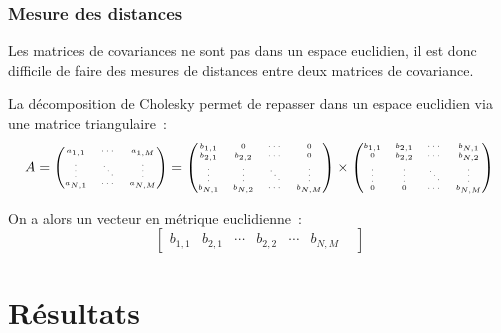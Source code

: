 \documentclass{beamer}
\begin{document}
\begin{frame}
    \frametitle{Mesure des distances}
    Les matrices de covariances ne sont pas dans un espace euclidien, il est donc difficile de faire des mesures de distances entre deux matrices de covariance.
    \vfill

    La décomposition de Cholesky permet de repasser dans un espace euclidien via une matrice triangulaire :
    \[
        \tiny \centering
        A =
        \begin{pmatrix}
            a_{1,1} & \cdots & a_{1,M} \\
            \vdots  & \ddots & \vdots  \\
            a_{N,1} & \cdots & a_{N,M} \\
        \end{pmatrix}
        =
        \begin{pmatrix}
            b_{1,1} & 0 & \cdots & 0 \\
            b_{2,1} & b_{2,2} & \cdots & 0 \\
            \vdots  & \vdots & \ddots & \vdots  \\
            b_{N,1} & b_{N,2} & \cdots & b_{N,M} \\
        \end{pmatrix}
        \times
        \begin{pmatrix}
            b_{1,1} & b_{2,1} & \cdots & b_{N,1} \\
            0       & b_{2,2} & \cdots & b_{N,2} \\
            \vdots  & \vdots  & \ddots & \vdots  \\
            0       & 0       & \cdots & b_{N,M}
        \end{pmatrix}
    \]

    On a alors un vecteur en métrique euclidienne :
    \[
        \begin{bmatrix}
            b_{1,1} &
            b_{2,1} &
            \cdots  &
            b_{2,2} &
            \cdots  &
            b_{N,M} &
        \end{bmatrix}
    \]
\end{frame}


\section{Résultats}
\end{document}
